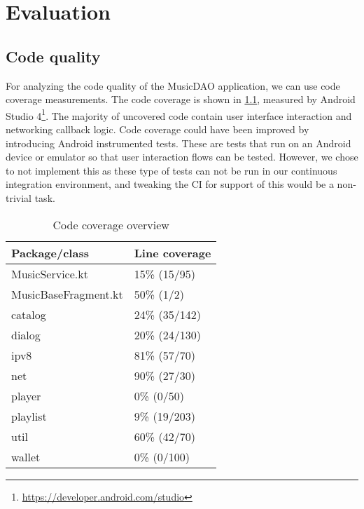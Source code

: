 \chapter{\label{chap:evaluation}Evaluation}

\section{Code quality}
For analyzing the code quality of the MusicDAO application, we can use code coverage measurements. The code coverage is shown in \ref{tab:code-cov}, measured by Android Studio 4\footnote{\url{https://developer.android.com/studio}}. The majority of uncovered code contain user interface interaction and networking callback logic. Code coverage could have been improved by introducing Android instrumented tests. These are tests that run on an Android device or emulator so that user interaction flows can be tested. However, we chose to not implement this as these type of tests can not be run in our continuous integration environment, and tweaking the CI for support of this would be a non-trivial task.
\begin{table}[]
\begin{tabular}{|l|l|}
\hline
\textbf{Package/class} & \textbf{Line coverage} \\ \hline
MusicService.kt        & 15\% (15/95)           \\ \hline
MusicBaseFragment.kt   & 50\% (1/2)             \\ \hline
catalog                & 24\% (35/142)          \\ \hline
dialog                 & 20\% (24/130)          \\ \hline
ipv8                   & 81\% (57/70)           \\ \hline
net                    & 90\% (27/30)           \\ \hline
player                 & 0\% (0/50)             \\ \hline
playlist               & 9\% (19/203)           \\ \hline
util                   & 60\% (42/70)           \\ \hline
wallet                 & 0\% (0/100)            \\ \hline
\end{tabular}
\caption{Code coverage overview}
\label{tab:code-cov}
\end{table}